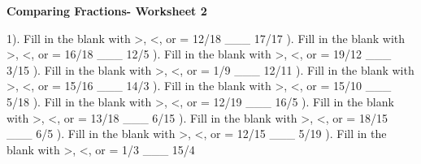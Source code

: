 \documentclass{article}%
\begin{document}
\newline%
\newline%
\newline%
\pagebreak%
\large%
\begin{center}%
\textbf{Comparing Fractions- Worksheet 2}%
\newline%
\end{center} \normalsize%
1). Fill in the blank with >, <, or = 12/18 \_\_\_ 17/17%
\newline%
\newline%
). Fill in the blank with >, <, or = 16/18 \_\_\_ 12/5%
\newline%
\newline%
). Fill in the blank with >, <, or = 19/12 \_\_\_ 3/15%
\newline%
\newline%
). Fill in the blank with >, <, or = 1/9 \_\_\_ 12/11%
\newline%
\newline%
). Fill in the blank with >, <, or = 15/16 \_\_\_ 14/3%
\newline%
\newline%
). Fill in the blank with >, <, or = 15/10 \_\_\_ 5/18%
\newline%
\newline%
). Fill in the blank with >, <, or = 12/19 \_\_\_ 16/5%
\newline%
\newline%
). Fill in the blank with >, <, or = 13/18 \_\_\_ 6/15%
\newline%
\newline%
). Fill in the blank with >, <, or = 18/15 \_\_\_ 6/5%
\newline%
\newline%
). Fill in the blank with >, <, or = 12/15 \_\_\_ 5/19%
\newline%
\newline%
). Fill in the blank with >, <, or = 1/3 \_\_\_ 15/4%
\newline%
\newline%
\end{document}
